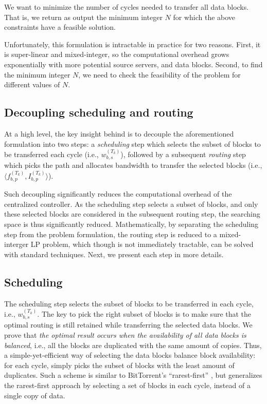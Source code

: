  We want to minimize the number of cycles needed to 
transfer all data blocks. That is, we return as output the minimum 
integer $N$ for which the above constraints have a feasible solution.

Unfortunately, this formulation is intractable in practice for two 
reasons. First, it is super-linear and mixed-integer, so the 
computational overhead grows exponentially with more potential source 
servers, and data blocks. Second, to find the minimum integer $N$, we 
need to check the feasibility of the problem for different values of 
$N$.

\subsection{Decoupling scheduling and routing}
\label{subsec:logic:separation}

At a high level, the key insight behind \name is to decouple the 
aforementioned formulation into two steps: a {\em scheduling} step 
which selects the subset of blocks to be transferred each cycle 
(i.e., $w^{(T_k)}_{b,s}$), followed by a subsequent {\em routing} 
step which picks the path and allocates bandwidth to transfer the 
selected blocks (i.e., 
$\langle f_{b,p}^{(T_k)}, I_{b,p}^{(T_k)}\rangle$).

Such decoupling significantly reduces the computational overhead of 
the centralized controller. As the scheduling step selects a subset 
of blocks, and only these selected blocks are considered in the 
subsequent routing step, the searching space is thus significantly 
reduced. Mathematically, by separating the scheduling step from the
problem formulation, the routing step is reduced to a mixed-interger
LP problem, which though is not immediately tractable, can be solved
with standard techniques. Next, we present each step in more details.

\subsection{Scheduling}
\label{subsec:logic:scheduling}

The scheduling step selects the subset of blocks to be transferred in
each cycle, i.e., $w^{(T_k)}_{b,s}$.
The key to pick the right subset of blocks is to make sure that the 
optimal routing is still retained while transferring the selected data
blocks. We prove that {\em the optimal result occurs when the 
availability of all data blocks is balanced}, i.e., all the blocks are 
duplicated with the same amount of copies. Thus, a 
simple-yet-efficient way of selecting the data blocks balance block 
availability: for each cycle, \name simply picks the subset of blocks 
with the least amount of duplicates. Such a scheme is similar to 
BitTorrent's ``rarest-first'' \cite{Cohen2003Incentives}, but \name 
generalizes the rarest-first approach by selecting a set of blocks in 
each cycle, instead of a single copy of data.


